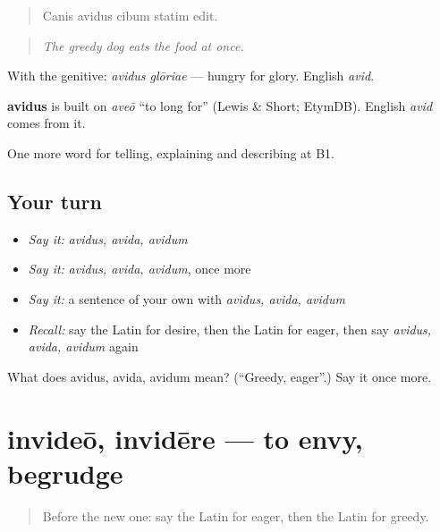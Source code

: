 \begin{quote}
Canis avidus cibum statim edit.
\end{quote}

\begin{quote}
\emph{The greedy dog eats the food at once.}
\end{quote}

With the genitive: \emph{avidus glōriae} — hungry for glory. English \emph{avid}.

\begin{cousinweb}
\textbf{avidus} is built on \emph{aveō} \textquotedblleft{}to long for\textquotedblright{} (Lewis \& Short; EtymDB). English \emph{avid} comes from it.
\end{cousinweb}

\begin{grammarlens}[title={What you've built}]
One more word for telling, explaining and describing at B1.
\end{grammarlens}

\subsection*{Your turn}
\begin{itemize}
\raggedright
  \item \emph{Say it:} \emph{avidus, avida, avidum}
  \item \emph{Say it:} \emph{avidus, avida, avidum}, once more
  \item \emph{Say it:} a sentence of your own with \emph{avidus, avida, avidum}
  \item \emph{Recall:} say the Latin for desire, then the Latin for eager, then say \emph{avidus, avida, avidum} again
\end{itemize}

\begin{tcolorbox}[breakable,colback=teal!4,colframe=teal!35!black,title={Before you move on}]
What does avidus, avida, avidum mean? (\textquotedblleft{}Greedy, eager\textquotedblright{}.) Say it once more.
\end{tcolorbox}
\section[invideō, invidēre]{invideō, invidēre — to envy, begrudge}

\label{lesson:LA-C500-invideo}



\begin{quote}
Before the new one: say the Latin for eager, then the Latin for greedy.
\end{quote}

